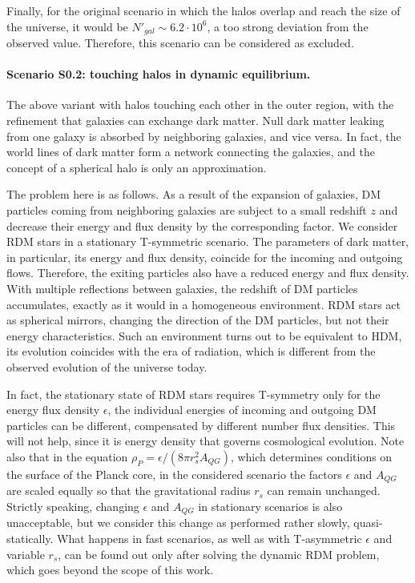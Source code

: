 \documentclass{article}
\begin{document}
Finally, for the original scenario in which the halos overlap and reach the size of the universe, it would be $ N '_ {gal} \sim6.2 \cdot10 ^ {6} $, a too strong deviation from the observed value. Therefore, this scenario can be considered as excluded. 

\paragraph {Scenario S0.2: touching halos in dynamic equilibrium.} The above variant with halos touching each other in the outer region, with the refinement that galaxies can exchange dark matter. Null dark matter leaking from one galaxy is absorbed by neighboring galaxies, and vice versa. In fact, the world lines of dark matter form a network connecting the galaxies, and the concept of a spherical halo is only an approximation.

The problem here is as follows. As a result of the expansion of galaxies, DM particles coming from neighboring galaxies are subject to a small redshift $ z $ and decrease their energy and flux density by the corresponding factor. We consider RDM stars in a stationary T-symmetric scenario. The parameters of dark matter, in particular, its energy and flux density, coincide for the incoming and outgoing flows. Therefore, the exiting particles also have a reduced energy and flux density. With multiple reflections between galaxies, the redshift of DM particles accumulates, exactly as it would in a homogeneous environment. RDM stars act as spherical mirrors, changing the direction of the DM particles, but not their energy characteristics. Such an environment turns out to be equivalent to HDM, its evolution coincides with the era of radiation, which is different from the observed evolution of the universe today.

In fact, the stationary state of RDM stars requires T-symmetry only for the energy flux density $ \epsilon $, the individual energies of incoming and outgoing DM particles can be different, compensated by different number flux densities. This will not help, since it is energy density that governs cosmological evolution. Note also that in the equation $ \rho_P = \epsilon / (8 \pi r_s ^ 2 A_ {QG}) $, which determines conditions on the surface of the Planck core, in the considered scenario the factors $ \epsilon $ and $ A_ {QG} $ are scaled equally so that the gravitational radius $ r_s $ can remain unchanged. Strictly speaking, changing $ \epsilon $ and $ A_ {QG} $ in stationary scenarios is also unacceptable, but we consider this change as performed rather slowly, quasi-statically. What happens in fast scenarios, as well as with T-asymmetric $ \epsilon $ and variable $ r_s $, can be found out only after solving the dynamic RDM problem, which goes beyond the scope of this work.
\end{document}
